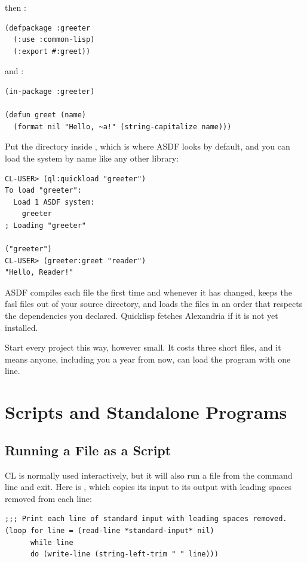 \noindent
then :

\begin{verbatim}
(defpackage :greeter
  (:use :common-lisp)
  (:export #:greet))
\end{verbatim}

\noindent
and :

\begin{verbatim}
(in-package :greeter)

(defun greet (name)
  (format nil "Hello, ~a!" (string-capitalize name)))
\end{verbatim}

Put the  directory inside ,
which is where ASDF looks by default, and you can load the system by
name like any other library:

\begin{verbatim}
CL-USER> (ql:quickload "greeter")
To load "greeter":
  Load 1 ASDF system:
    greeter
; Loading "greeter"

("greeter")
CL-USER> (greeter:greet "reader")
"Hello, Reader!"
\end{verbatim}

ASDF compiles each file the first time and whenever it has changed,
keeps the fasl files out of your source directory, and loads the files
in an order that respects the dependencies you declared. Quicklisp
fetches Alexandria if it is not yet installed.

Start every project this way, however small. It costs three short
files, and it means anyone, including you a year from now, can load
the program with one line.

\section{Scripts and Standalone Programs}

\subsection{Running a File as a Script}

CL is normally used interactively, but it will also run a file from
the command line and exit. Here is , which copies
its input to its output with leading spaces removed from each line:

\begin{verbatim}
;;; Print each line of standard input with leading spaces removed.
(loop for line = (read-line *standard-input* nil)
      while line
      do (write-line (string-left-trim " " line)))
\end{verbatim}

